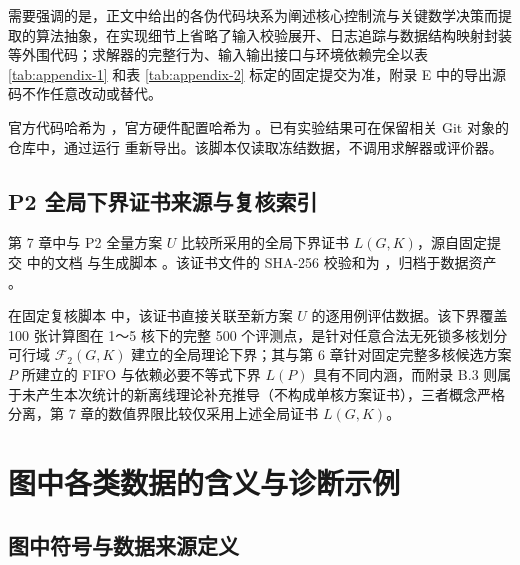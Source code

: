 \documentclass[anonymous,withtoc]{gmcm2026}
\begin{document}
需要强调的是，正文中给出的各伪代码块系为阐述核心控制流与关键数学决策而提取的算法抽象，在实现细节上省略了输入校验展开、日志追踪与数据结构映射封装等外围代码；求解器的完整行为、输入输出接口与环境依赖完全以表 \ref{tab:appendix-1} 和表 \ref{tab:appendix-2} 标定的固定提交为准，附录 E 中的导出源码不作任意改动或替代。

官方代码哈希为 \texttt{}，官方硬件配置哈希为 \texttt{}。已有实验结果可在保留相关 Git 对象的仓库中，通过运行 \texttt{} 重新导出。该脚本仅读取冻结数据，不调用求解器或评价器。

\subsection{P2 全局下界证书来源与复核索引}

第 7 章中与 P2 全量方案 \(U\) 比较所采用的全局下界证书 \(L(G, K)\)，源自固定提交 \texttt{} 中的文档 \texttt{} 与生成脚本 \texttt{}。该证书文件的 SHA-256 校验和为 \texttt{}，归档于数据资产 \texttt{}。

在固定复核脚本 \texttt{} 中，该证书直接关联至新方案 \(U\) 的逐用例评估数据。该下界覆盖 100 张计算图在 1～5 核下的完整 500 个评测点，是针对任意合法无死锁多核划分可行域 \(\mathcal{F}_2(G, K)\) 建立的全局理论下界；其与第 6 章针对固定完整多核候选方案 \(P\) 所建立的 FIFO 与依赖必要不等式下界 \(L(P)\) 具有不同内涵，而附录 B.3 则属于未产生本次统计的新离线理论补充推导（不构成单核方案证书），三者概念严格分离，第 7 章的数值界限比较仅采用上述全局证书 \(L(G, K)\)。

\section{图中各类数据的含义与诊断示例}

\subsection{图中符号与数据来源定义}
\end{document}
